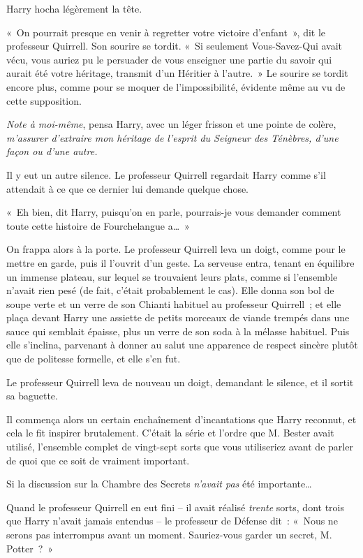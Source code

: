 Harry hocha légèrement la tête.

«~On pourrait presque en venir à regretter votre victoire d'enfant~», dit le professeur Quirrell. Son sourire se tordit. «~Si seulement Vous-Savez-Qui avait vécu, vous auriez pu le persuader de vous enseigner une partie du savoir qui aurait été votre héritage, transmit d'un Héritier à l'autre.~» Le sourire se tordit encore plus, comme pour se moquer de l'impossibilité, évidente même au vu de cette supposition.

\emph{Note à moi-même}, pensa Harry, avec un léger frisson et une pointe de colère, \emph{m'assurer d'extraire mon héritage de l'esprit du Seigneur des Ténèbres, d'une façon ou d'une autre.}

Il y eut un autre silence. Le professeur Quirrell regardait Harry comme s'il attendait à ce que ce dernier lui demande quelque chose.

«~Eh bien, dit Harry, puisqu'on en parle, pourrais-je vous demander comment toute cette histoire de Fourchelangue a…~»

On frappa alors à la porte. Le professeur Quirrell leva un doigt, comme pour le mettre en garde, puis il l'ouvrit d'un geste. La serveuse entra, tenant en équilibre un immense plateau, sur lequel se trouvaient leurs plats, comme si l'ensemble n'avait rien pesé (de fait, c'était probablement le cas). Elle donna son bol de soupe verte et un verre de son Chianti habituel au professeur Quirrell~; et elle plaça devant Harry une assiette de petits morceaux de viande trempés dans une sauce qui semblait épaisse, plus un verre de son soda à la mélasse habituel. Puis elle s'inclina, parvenant à donner au salut une apparence de respect sincère plutôt que de politesse formelle, et elle s'en fut.

Le professeur Quirrell leva de nouveau un doigt, demandant le silence, et il sortit sa baguette.

Il commença alors un certain enchaînement d'incantations que Harry reconnut, et cela le fit inspirer brutalement. C'était la série et l'ordre que M. Bester avait utilisé, l'ensemble complet de vingt-sept sorts que vous utiliseriez avant de parler de quoi que ce soit de vraiment important.

Si la discussion sur la Chambre des Secrets \emph{n'avait pas} été importante…

Quand le professeur Quirrell en eut fini -- il avait réalisé \emph{trente} sorts, dont trois que Harry n'avait jamais entendus -- le professeur de Défense dit~: «~Nous ne serons pas interrompus avant un moment. Sauriez-vous garder un secret, M. Potter~?~»

